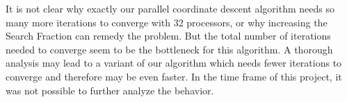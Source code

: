 It is not clear why exactly our parallel coordinate descent algorithm needs so many more iterations to converge with 32 processors, or why increasing the Search Fraction can remedy the problem. But the total number of iterations needed to converge seem to be the bottleneck for this algorithm. A thorough analysis may lead to a variant of our algorithm which needs fewer iterations to converge and therefore may be even faster. In the time frame of this project, it was not possible to further analyze the behavior.